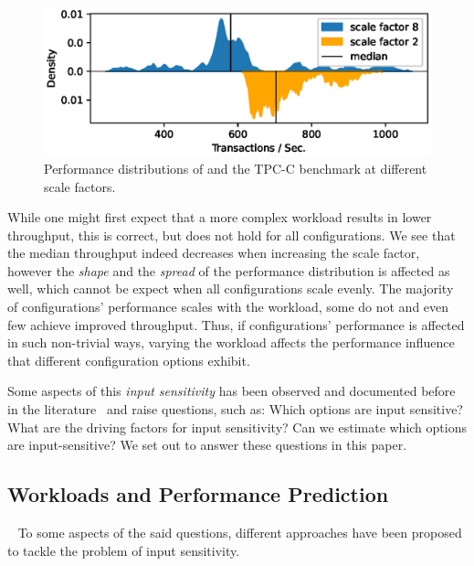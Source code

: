 \begin{figure}
	\centering
	\includegraphics[width=0.9\linewidth]{images/h2_motivation.eps}
	\caption{Performance distributions of \htwo and the \textsf{TPC-C} benchmark at different scale factors.}
	\label{fig:h2_intro}
\end{figure}

While one might first expect that a more complex workload results in lower throughput, this is correct, but does not hold for all configurations. We see that the median throughput indeed decreases when increasing the scale factor, however the \emph{shape} and the \emph{spread} of the performance distribution is affected as well, which cannot be expect when all configurations scale evenly. The majority of configurations’ performance scales with the workload, some do not and even few achieve improved throughput. Thus, if configurations’ performance is affected in such non-trivial ways, varying the workload affects the performance influence that different configuration options exhibit. 

Some aspects of this \emph{input sensitivity} has been observed and documented before in the literature~\cite{liao_2020_using_emse,alves_sampling_2020,jamishidi_transfer_2017} and raise questions, such as: Which options are input sensitive? What are the driving factors for input sensitivity? Can we estimate which options are input-sensitive? We set out to answer these questions in this paper.

	
\subsection{Workloads and Performance Prediction} ~\label{sec:strategies}
To some aspects of the said questions, different approaches have been proposed to tackle the problem of input sensitivity.

